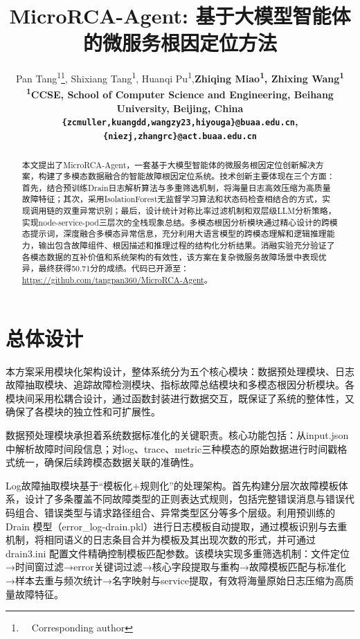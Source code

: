 \documentclass[11pt]{article}
\title{MicroRCA-Agent: 基于大模型智能体的微服务根因定位方法}
\author{
    Pan Tang\textsuperscript{\rm 1}\thanks{\ \ Corresponding author}, Shixiang Tang\textsuperscript{\rm 1}, Huanqi Pu\textsuperscript{\rm 1},\bf {Zhiqing Miao\textsuperscript{\rm 1}, Zhixing Wang\textsuperscript{\rm 1}}\\
    \textsuperscript{\rm 1}CCSE, School of Computer Science and Engineering, Beihang University, Beijing, China\\
    \texttt{\{zcmuller,kuangdd,wangzy23,hiyouga\}@buaa.edu.cn}, \texttt{\{niezj,zhangrc\}@act.buaa.edu.cn}
}
\begin{document}
\maketitle
\begin{abstract}
本文提出了MicroRCA-Agent，一套基于大模型智能体的微服务根因定位创新解决方案，构建了多模态数据融合的智能故障根因定位系统。技术创新主要体现在三个方面：首先，结合预训练Drain日志解析算法与多重筛选机制，将海量日志高效压缩为高质量故障特征；其次，采用IsolationForest无监督学习算法和状态码检查相结合的方式，实现调用链的双重异常识别；最后，设计统计对称比率过滤机制和双层级LLM分析策略，实现node-service-pod三层次的全栈现象总结。多模态根因分析模块通过精心设计的跨模态提示词，深度融合多模态异常信息，充分利用大语言模型的跨模态理解和逻辑推理能力，输出包含故障组件、根因描述和推理过程的结构化分析结果。消融实验充分验证了各模态数据的互补价值和系统架构的有效性，该方案在复杂微服务故障场景中表现优异，最终获得50.71分的成绩。代码已开源至：\url{https://github.com/tangpan360/MicroRCA-Agent}。

\end{abstract}

\section{总体设计}
\label{sec:design}
本方案采用模块化架构设计，整体系统分为五个核心模块：数据预处理模块、日志故障抽取模块、追踪故障检测模块、指标故障总结模块和多模态根因分析模块。各模块间采用松耦合设计，通过函数封装进行数据交互，既保证了系统的整体性，又确保了各模块的独立性和可扩展性。

数据预处理模块承担着系统数据标准化的关键职责。核心功能包括：从input.json中解析故障时间段信息；对log、trace、metric三种模态的原始数据进行时间戳格式统一，确保后续跨模态数据关联的准确性。

Log故障抽取模块基于“模板化+规则化”的处理架构。首先构建分层次故障模板体系，设计了多条覆盖不同故障类型的正则表达式规则，包括完整错误消息与错误代码组合、错误类型与请求路径组合、异常类型区分等多个层级。利用预训练的 Drain 模型\cite{he2017drain}（error\_log-drain.pkl）进行日志模板自动提取，通过模板识别与去重机制，将相同语义的日志条目合并为模板及其出现次数的形式，并可通过 drain3.ini 配置文件精确控制模板匹配参数。该模块实现多重筛选机制：文件定位→时间窗过滤→error关键词过滤→核心字段提取与重构→故障模板匹配与标准化→样本去重与频次统计→名字映射与service提取，有效将海量原始日志压缩为高质量故障特征。
\end{document}

